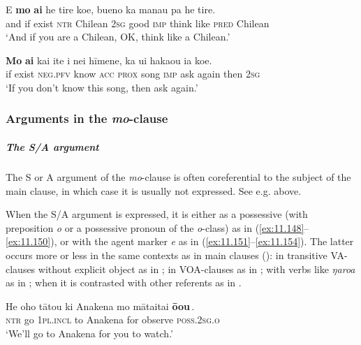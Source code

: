 \ea\label{ex:11.146}
\gll {\ꞌ}E \textbf{mo} \textbf{ai} he tire koe, bueno ka mana{\ꞌ}u pa he tire. \\
and if exist \textsc{ntr} Chilean \textsc{2sg} good \textsc{imp} think like \textsc{pred} Chilean \\

\glt 
‘And if you are a Chilean, OK, think like a Chilean.’ \textstyleExampleref{[R625.098]} 
\z

\ea\label{ex:11.147}
\gll \textbf{Mo} \textbf{ai} kai {\ꞌ}ite i nei hīmene, ka {\ꞌ}ui haka{\ꞌ}ou ia koe.\\
if exist \textsc{neg.pfv} know \textsc{acc} \textsc{prox} song \textsc{imp} ask again then \textsc{2sg}\\

\glt 
‘If you don’t know this song, then ask again.’ \textstyleExampleref{[R615.139]} 
\z

\subsubsection[Arguments in the mo{}-clause]{Arguments in the \textit{mo}{}-clause}\label{sec:11.5.1.2}

\subparagraph{The S/A argument} The S or A argument of the \textit{mo}{}-clause is often coreferential to the subject of the main clause, in which case it is usually not expressed. See e.g.  above.

When the S/A argument is expressed, it is either as a possessive (with preposition \textit{o} or a possessive pronoun of the \textit{o}{}-class) as in (\ref{ex:11.148}–\ref{ex:11.150}), or with the agent marker \textit{e} as in (\ref{ex:11.151}–\ref{ex:11.154}). The latter occurs more or less in the same contexts as in main clauses (): in transitive VA-clauses without explicit object as in ; in VOA-clauses as in ; with verbs like \textit{ŋaro{\ꞌ}a} as in ; when it is contrasted with other referents as in .

\ea\label{ex:11.148}
\gll He oho tātou ki {\ꞌ}Anakena {\ob}mo māta{\ꞌ}ita{\ꞌ}i \textbf{ō{\ꞌ}ou}\,{\cb}. \\
\textsc{ntr} go \textsc{1pl.incl} to Anakena {\db}for observe \textsc{poss.2sg.o} \\

\glt 
‘We’ll go to Anakena for you to watch.’ \textstyleExampleref{[R301.259]} 
\z

